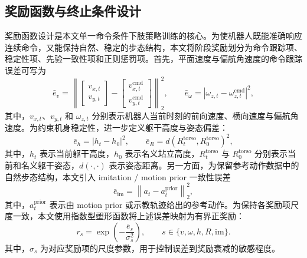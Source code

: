 \subsection{奖励函数与终止条件设计}

奖励函数设计是本文单一命令条件下肢策略训练的核心。为使机器人既能准确响应连续命令，又能保持自然、稳定的步态结构，本文将阶段奖励划分为命令跟踪项、稳定性项、先验一致性项和正则惩罚项。首先，平面速度与偏航角速度的命令跟踪误差可写为
\begin{equation}
\bar{e}_{v} = \left\|
\begin{bmatrix}
v_{x,t} \\
v_{y,t}
\end{bmatrix}
-
\begin{bmatrix}
v_{x,t}^{\mathrm{cmd}} \\
v_{y,t}^{\mathrm{cmd}}
\end{bmatrix}
\right\|_2^2,\qquad
\bar{e}_{\omega} = \left| \omega_{z,t} - \omega_{z,t}^{\mathrm{cmd}} \right|^2,
\end{equation}
其中，$v_{x,t}$、$v_{y,t}$ 和 $\omega_{z,t}$ 分别表示机器人当前时刻的前向速度、横向速度与偏航角速度。为约束机身稳定性，进一步定义躯干高度与姿态偏差：
\begin{equation}
\bar{e}_{h} = \left| h_t - h_0 \right|^2,\qquad
\bar{e}_{R} = d\!\left(R_t^{\mathrm{torso}}, R_0^{\mathrm{torso}}\right)^2,
\end{equation}
其中，$h_t$ 表示当前躯干高度，$h_0$ 表示名义站立高度，$R_t^{\mathrm{torso}}$ 与 $R_0^{\mathrm{torso}}$ 分别表示当前和名义躯干姿态，$d(\cdot,\cdot)$ 表示姿态距离。另一方面，为保留参考动作数据中的自然步态结构，本文引入 imitation / motion prior 一致性误差
\begin{equation}
\bar{e}_{\mathrm{im}} = \left\| a_t - a_t^{\mathrm{prior}} \right\|_2^2,
\end{equation}
其中，$a_t^{\mathrm{prior}}$ 表示由 motion prior 或示教轨迹给出的参考动作。为保持各奖励项尺度一致，本文使用指数型塑形函数将上述误差映射为有界正奖励：
\begin{equation}
r_s = \exp\!\left(-\frac{\bar{e}_s}{\sigma_s^2}\right), \qquad s\in\{v,\omega,h,R,\mathrm{im}\}.
\end{equation}
其中，$\sigma_s$ 为对应奖励项的尺度参数，用于控制误差到奖励衰减的敏感程度。

